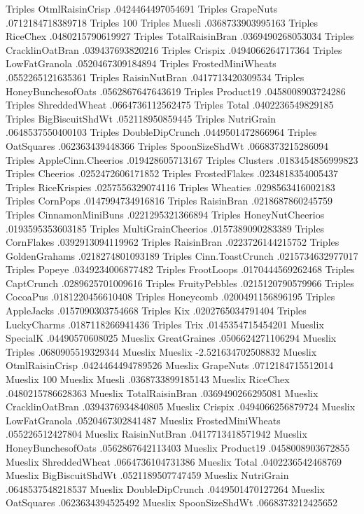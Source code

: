 Triples	OtmlRaisinCrisp	.0424464497054691
Triples	GrapeNuts	.0712184718389718
Triples	100%
Triples	Muesli	.0368733903995163
Triples	RiceChex	.0480215790619927
Triples	TotalRaisinBran	.0369490268053034
Triples	CracklinOatBran	.039437693820216
Triples	Crispix	.0494066264717364
Triples	LowFatGranola	.0520467309184894
Triples	FrostedMiniWheats	.0552265121635361
Triples	RaisinNutBran	.0417713420309534
Triples	HoneyBunchesofOats	.0562867647643619
Triples	Product19	.0458008903724286
Triples	ShreddedWheat	.0664736112562475
Triples	Total	.0402236549829185
Triples	BigBiscuitShdWt	.052118950859445
Triples	NutriGrain	.0648537550400103
Triples	DoubleDipCrunch	.0449501472866964
Triples	OatSquares	.062363439448366
Triples	SpoonSizeShdWt	.0668373215286094
Triples	AppleCinn.Cheerios	.019428605713167
Triples	Clusters	.0183454856999823
Triples	Cheerios	.0252472606171852
Triples	FrostedFlakes	.0234818354005437
Triples	RiceKrispies	.0257556329074116
Triples	Wheaties	.0298563416002183
Triples	CornPops	.0147994734916816
Triples	RaisinBran	.0218687860245759
Triples	CinnamonMiniBuns	.0221295321366894
Triples	HoneyNutCheerios	.0193595353603185
Triples	MultiGrainCheerios	.0157389090283389
Triples	CornFlakes	.0392913094119962
Triples	RaisinBran	.0223726144215752
Triples	GoldenGrahams	.0218274801093189
Triples	Cinn.ToastCrunch	.0215734632977017
Triples	Popeye	.0349234006877482
Triples	FrootLoops	.0170444569262468
Triples	CaptCrunch	.0289625701009616
Triples	FruityPebbles	.0215120790579966
Triples	CocoaPus	.0181220456610408
Triples	Honeycomb	.0200491156896195
Triples	AppleJacks	.0157090303754668
Triples	Kix	.0202765034791404
Triples	LuckyCharms	.0187118266941436
Triples	Trix	.0145354715454201
Mueslix	SpecialK	.04490570608025
Mueslix	GreatGraines	.0506624271106294
Mueslix	Triples	.0680905519329344
Mueslix	Mueslix	-2.521634702508832
Mueslix	OtmlRaisinCrisp	.0424464494789526
Mueslix	GrapeNuts	.0712184715512014
Mueslix	100%
Mueslix	Muesli	.0368733899185143
Mueslix	RiceChex	.0480215786628363
Mueslix	TotalRaisinBran	.0369490266295081
Mueslix	CracklinOatBran	.0394376934840805
Mueslix	Crispix	.0494066256879724
Mueslix	LowFatGranola	.0520467302841487
Mueslix	FrostedMiniWheats	.055226512427804
Mueslix	RaisinNutBran	.0417713418571942
Mueslix	HoneyBunchesofOats	.0562867642113403
Mueslix	Product19	.0458008903672855
Mueslix	ShreddedWheat	.0664736104731386
Mueslix	Total	.0402236542468769
Mueslix	BigBiscuitShdWt	.0521189507747459
Mueslix	NutriGrain	.0648537548218537
Mueslix	DoubleDipCrunch	.0449501470127264
Mueslix	OatSquares	.0623634394525492
Mueslix	SpoonSizeShdWt	.0668373212425652
